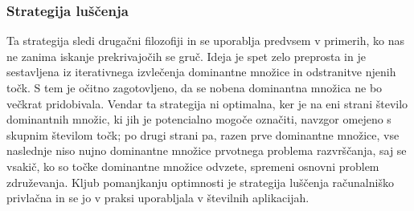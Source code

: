 \documentclass[a4paper]{article}
\begin{document}
\subsubsection{Strategija luščenja} Ta strategija sledi drugačni filozofiji in se uporablja predvsem v primerih, ko nas ne zanima iskanje prekrivajočih se gruč. Ideja je spet zelo preprosta in je sestavljena iz iterativnega izvlečenja dominantne množice in odstranitve njenih točk. S tem je očitno zagotovljeno, da se nobena dominantna množica ne bo večkrat pridobivala. Vendar ta strategija ni optimalna, ker je na eni strani število dominantnih množic, ki jih je potencialno mogoče označiti, navzgor omejeno s skupnim številom točk; po drugi strani pa, razen prve dominantne množice, vse naslednje niso nujno dominantne množice prvotnega problema razvrščanja, saj se vsakič, ko so točke dominantne množice odvzete, spremeni osnovni problem združevanja. Kljub pomanjkanju optimnosti je strategija luščenja računalniško privlačna in se jo v praksi uporabljala v številnih aplikacijah.
\end{document}

